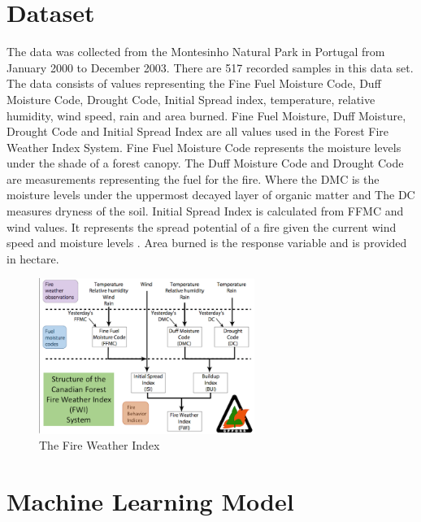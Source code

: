 \documentclass[conference]{IEEEtran}
\begin{document}
\section{Dataset}
The data was collected from the Montesinho Natural Park in Portugal from January 2000 to December 2003. There are 517 recorded samples in this data set. The data consists of values representing the Fine Fuel Moisture Code, Duff Moisture Code, Drought Code, Initial Spread index, temperature, relative humidity, wind speed, rain and area burned. Fine Fuel Moisture, Duff Moisture, Drought Code and Initial Spread Index are all values used in the Forest Fire Weather Index System. Fine Fuel Moisture Code represents the moisture levels under the shade of a forest canopy. The Duff Moisture Code and Drought Code are measurements representing the fuel for the fire. Where the DMC is the moisture levels under the uppermost decayed layer of organic matter and The DC measures dryness of the soil. Initial Spread Index is calculated from FFMC and wind values. It represents the spread potential of a fire given the current wind speed and moisture levels \cite{b3}. Area burned is the response variable and is provided in hectare.

\begin{figure}[h]
\includegraphics[width=7cm]{FireWeatherIndex.png}
\centering
\caption{The Fire Weather Index\cite{b3}}
\label{fig:Fire Weather Index}
\end{figure}

\section{Machine Learning Model}
\end{document}

